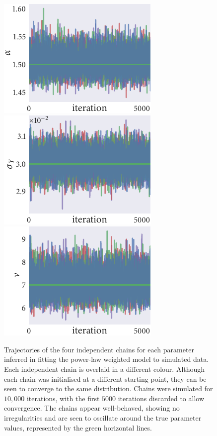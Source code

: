\begin{figure}[tbp]
  \includegraphics{power_trace_alpha.pdf}%
  \includegraphics{power_trace_sigma_Y.pdf}%
  \includegraphics{power_trace_nu.pdf}
  \caption{Trajectories of the four independent chains for each parameter
    inferred in fitting the power-law weighted model to simulated data. Each
    independent chain is overlaid in a different colour. Although each chain
    was initialised at a different starting point, they can be seen to
    converge to the same distribution. Chains were simulated for $10,000$
    iterations, with the first $5000$ iterations discarded to allow
    convergence. The chains appear well-behaved, showing no irregularities
    and are seen to oscillate around the true parameter values, represented
    by the green horizontal lines.}
  \label{fig:power_trace}
\end{figure}

